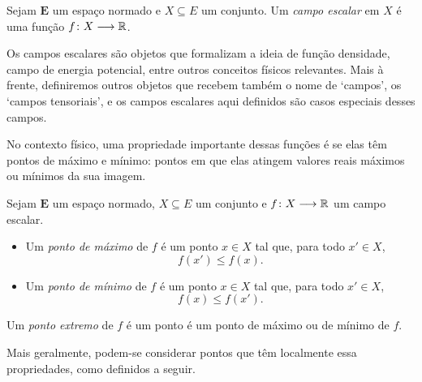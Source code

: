 \begin{definition}
Sejam $\bm E$ um espaço normado e $X \subseteq E$ um conjunto. Um \emph{campo escalar} em $X$ é uma função ${f}\colon {X} \longrightarrow {\mathbb{R}}$.
\end{definition}

Os campos escalares são objetos que formalizam a ideia de função densidade, campo de energia potencial, entre outros conceitos físicos relevantes. Mais à frente, definiremos outros objetos que recebem também o nome de `campos', os `campos tensoriais', e os campos escalares aqui definidos são casos especiais desses campos.

No contexto físico, uma propriedade importante dessas funções é se elas têm pontos de máximo e mínimo: pontos em que elas atingem valores reais máximos ou mínimos da sua imagem.

\begin{definition}
Sejam $\bm E$ um espaço normado, $X \subseteq E$ um conjunto e ${f}\colon {X} \longrightarrow {\mathbb{R}}$ um campo escalar.
	\begin{itemize}
	\item Um \emph{ponto de máximo} de $f$ é um ponto $x \in X$ tal que, para todo $x' \in X$,
		\begin{equation*}
		f(x') \leq f(x).
		\end{equation*}
	\item Um \emph{ponto de mínimo} de $f$ é um ponto $x \in X$ tal que, para todo $x' \in X$,
		\begin{equation*}
		f(x) \leq f(x').
		\end{equation*}
	\end{itemize}
Um \emph{ponto extremo} de $f$ é um ponto é um ponto de máximo ou de mínimo de $f$.
\end{definition}

Mais geralmente, podem-se considerar pontos que têm localmente essa propriedades, como definidos a seguir.

\begin{comment}
\begin{definition}[Ponto extremo local]
Sejam $\bm E$ um espaço normado, $X \subseteq E$ um conjunto e $\fun{f}{X}{\R}$ um campo escalar.
	\begin{itemize}
	\item Um \emph{ponto de máximo local} de $f$ é um ponto $x \in X$ tal que, para alguma vizinhança $V \subseteq E$ de $x$, $f$ satisfaz que, para todo $x' \in V \cap X$,
		\begin{equation*}
		f(x') \leq f(x).
		\end{equation*}
	\item Um \emph{ponto de mínimo local} de $f$ é um ponto $x \in X$ tal que, para alguma vizinhança $V \subseteq E$ de $x$, $f$ satisfaz que, para todo $x' \in V \cap X$,
		\begin{equation*}
		f(x) \leq f(x').
		\end{equation*}
	\end{itemize}
Um \emph{ponto extremo local} de $f$ é um ponto é um ponto de máximo local ou de mínimo local de $f$.
\end{definition}
\end{comment}

